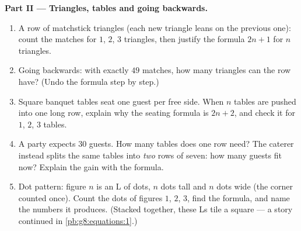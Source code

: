 \begin{problem}
\medskip
\noindent\textbf{Part II --- Triangles, tables and going
backwards.}
\begin{enumerate}[resume]
  \item A row of matchstick triangles (each new triangle leans on
        the previous one): count the matches for $1$, $2$, $3$
        triangles, then justify the formula $2n + 1$ for $n$
        triangles.
  \item Going backwards: with exactly $49$ matches, how many
        triangles can the row have? (Undo the formula step by
        step.)
  \item Square banquet tables seat one guest per free side. When
        $n$ tables are pushed into one long row, explain why the
        seating formula is $2n + 2$, and check it for $1$, $2$,
        $3$ tables.
  \item A party expects $30$ guests. How many tables does one row
        need? The caterer instead splits the same tables into
        \emph{two} rows of seven: how many guests fit now?
        Explain the gain with the formula.
  \item Dot pattern: figure $n$ is an L of dots, $n$ dots tall
        and $n$ dots wide (the corner counted once). Count the
        dots of figures $1$, $2$, $3$, find the formula, and name
        the numbers it produces. (Stacked together, these Ls tile
        a square --- a story continued in
        \cref{pb:g8:equations:1}.)
\end{enumerate}


\end{problem}
